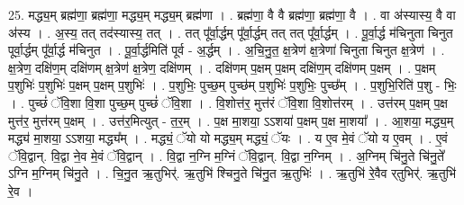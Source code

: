 \documentclass[17pt]{extarticle}
\begin{document}
25. मद्ध्य॒म् ब्रह्म॑णा॒ ब्रह्म॑णा॒ मद्ध्य॒म् मद्ध्य॒म् ब्रह्म॑णा । . ब्रह्म॑णा॒ वै वै ब्रह्म॑णा॒ ब्रह्म॑णा॒ वै । . वा अ॑स्यास्य॒ वै वा अ॑स्य । . अ॒स्य॒ तत् तद॑स्यास्य॒ तत् । . तत् पू᳚र्वा॒र्द्धम् पू᳚र्वा॒र्द्धम् तत् तत् पू᳚र्वा॒र्द्धम् । . पू॒र्वा॒र्द्ध म॑चिनुता चिनुत पूर्वा॒र्द्धम् पू᳚र्वा॒र्द्ध म॑चिनुत । . पू॒र्वा॒र्द्धमिति॑ पूर्व - अ॒र्द्धम् । . अ॒चि॒नु॒त॒ क्ष॒त्रेण॑ क्ष॒त्रेणा॑ चिनुता चिनुत क्ष॒त्रेण॑ । . क्ष॒त्रेण॒ दक्षि॑ण॒म् दक्षि॑णम् क्ष॒त्रेण॑ क्ष॒त्रेण॒ दक्षि॑णम् । . दक्षि॑णम् प॒क्षम् प॒क्षम् दक्षि॑ण॒म् दक्षि॑णम् प॒क्षम् । . प॒क्षम् प॒शुभिः॑ प॒शुभिः॑ प॒क्षम् प॒क्षम् प॒शुभिः॑ । . प॒शुभिः॒ पुच्छ॒म् पुच्छ॑म् प॒शुभिः॑ प॒शुभिः॒ पुच्छ᳚म् । . प॒शुभि॒रिति॑ प॒शु - भिः॒ । . पुच्छं॑ ॅवि॒शा वि॒शा पुच्छ॒म् पुच्छं॑ ॅवि॒शा । . वि॒शोत्त॑र॒ मुत्त॑रं ॅवि॒शा वि॒शोत्त॑रम् । . उत्त॑रम् प॒क्षम् प॒क्ष मुत्त॑र॒ मुत्त॑रम् प॒क्षम् । . उत्त॑र॒मित्युत् - त॒र॒म् । . प॒क्ष मा॒शया॒ ऽऽशया॑ प॒क्षम् प॒क्ष मा॒शया᳚ । . आ॒शया॒ मद्ध्य॒म् मद्ध्य॑ मा॒शया॒ ऽऽशया॒ मद्ध्य᳚म् । . मद्ध्यं॒ ॅयो यो मद्ध्य॒म् मद्ध्यं॒ ॅयः । . य ए॒व मे॒वं ॅयो य ए॒वम् । . ए॒वं ॅवि॒द्वान्. वि॒द्वा ने॒व मे॒वं ॅवि॒द्वान् । . वि॒द्वा न॒ग्नि म॒ग्निं ॅवि॒द्वान्. वि॒द्वा न॒ग्निम् । . अ॒ग्निम् चि॑नु॒ते चि॑नु॒ते᳚ ऽग्नि म॒ग्निम् चि॑नु॒ते । . चि॒नु॒त ऋ॒तुभिर्॑. ऋ॒तुभि॑ श्चिनु॒ते चि॑नु॒त ऋ॒तुभिः॑ । . ऋ॒तुभि॑ रे॒वैव र्‌तुभिर्॑. ऋ॒तुभि॑ रे॒व । \newline
\end{document}
